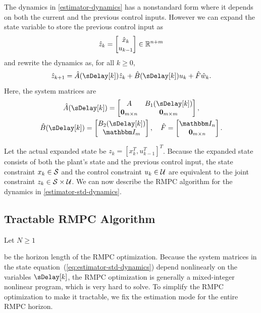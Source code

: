 The dynamics in \eqref{estimator-dynamics} has a nonstandard form
where it depends on both the current and the previous control inputs.
However we can expand the state variable to store the previous control
input as
\[
\hat{z}_{k}=\begin{bmatrix}\hat{x}_{k}\\
u_{k-1}
\end{bmatrix}\in\mathbb{R}^{n+m}
\]
and rewrite the dynamics as, for all $k\geq0$,
\begin{equation}
\hat{z}_{k+1}=\hat{A}(\sDelay[k])\hat{z}_{k}+\hat{B}(\sDelay[k])u_{k}+\hat{F}\hat{w}_{k}\text{.}\label{eq:estimator-std-dynamics}
\end{equation}
Here, the system matrices are
\begin{equation}
\begin{gathered}
\hat{A}(\sDelay[k])=\begin{bmatrix}A & B_{1}(\sDelay[k])\\
\bm{0}_{m\times n} & \bm{0}_{m\times m}
\end{bmatrix},\\
\hat{B}(\sDelay[k])=\begin{bmatrix}B_{2}(\sDelay[k])\\
\IdentityMatrix_{m}
\end{bmatrix},\quad\hat{F}=\begin{bmatrix}\IdentityMatrix_{n}\\
\bm{0}_{m\times n}
\end{bmatrix}\text{.}
\end{gathered}
\label{eq:lifted-matrices}
\end{equation}

Let the actual expanded state be $z_{k}=\left[x_{k}^{T},u_{k-1}^{T}\right]^{T}$.
Because the expanded state consists of both the plant's state and
the previous control input, the state constraint $x_{k}\in\mathcal{S}$
and the control constraint $u_{k}\in\mathcal{U}$ are equivalent to the
joint constraint $z_{k}\in\mathcal{S}\times\mathcal{U}$. We can now describe
the RMPC algorithm for the dynamics in \eqref{estimator-std-dynamics}.


\subsection{Tractable RMPC Algorithm}

Let $N\geq1$ %

{} be the horizon length of the RMPC optimization. Because the system
matrices in the state equation~(\ref{eq:estimator-std-dynamics})
depend nonlinearly on the variables $\sDelay[k]$, the RMPC optimization
is generally a mixed-integer nonlinear program, which is very hard
to solve. To simplify the RMPC optimization to make it tractable, we fix the estimation mode for the entire RMPC horizon.

